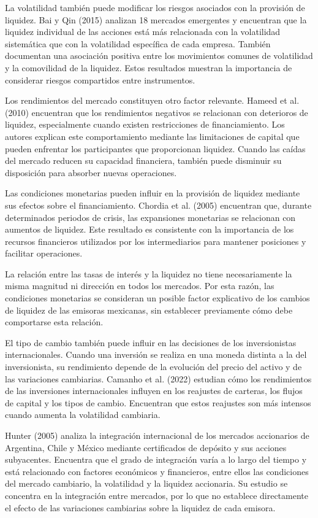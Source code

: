 La volatilidad también puede modificar los riesgos asociados con la provisión de liquidez. Bai y Qin (2015) analizan 18 mercados emergentes y encuentran que la liquidez individual de las acciones está más relacionada con la volatilidad sistemática que con la volatilidad específica de cada empresa. También documentan una asociación positiva entre los movimientos comunes de volatilidad y la comovilidad de la liquidez. Estos resultados muestran la importancia de considerar riesgos compartidos entre instrumentos.

Los rendimientos del mercado constituyen otro factor relevante. Hameed et al. (2010) encuentran que los rendimientos negativos se relacionan con deterioros de liquidez, especialmente cuando existen restricciones de financiamiento. Los autores explican este comportamiento mediante las limitaciones de capital que pueden enfrentar los participantes que proporcionan liquidez. Cuando las caídas del mercado reducen su capacidad financiera, también puede disminuir su disposición para absorber nuevas operaciones.

Las condiciones monetarias pueden influir en la provisión de liquidez mediante sus efectos sobre el financiamiento. Chordia et al. (2005) encuentran que, durante determinados periodos de crisis, las expansiones monetarias se relacionan con aumentos de liquidez. Este resultado es consistente con la importancia de los recursos financieros utilizados por los intermediarios para mantener posiciones y facilitar operaciones.

La relación entre las tasas de interés y la liquidez no tiene necesariamente la misma magnitud ni dirección en todos los mercados. Por esta razón, las condiciones monetarias se consideran un posible factor explicativo de los cambios de liquidez de las emisoras mexicanas, sin establecer previamente cómo debe comportarse esta relación.

El tipo de cambio también puede influir en las decisiones de los inversionistas internacionales. Cuando una inversión se realiza en una moneda distinta a la del inversionista, su rendimiento depende de la evolución del precio del activo y de las variaciones cambiarias. Camanho et al. (2022) estudian cómo los rendimientos de las inversiones internacionales influyen en los reajustes de carteras, los flujos de capital y los tipos de cambio. Encuentran que estos reajustes son más intensos cuando aumenta la volatilidad cambiaria.

Hunter (2005) analiza la integración internacional de los mercados accionarios de Argentina, Chile y México mediante certificados de depósito y sus acciones subyacentes. Encuentra que el grado de integración varía a lo largo del tiempo y está relacionado con factores económicos y financieros, entre ellos las condiciones del mercado cambiario, la volatilidad y la liquidez accionaria. Su estudio se concentra en la integración entre mercados, por lo que no establece directamente el efecto de las variaciones cambiarias sobre la liquidez de cada emisora.

